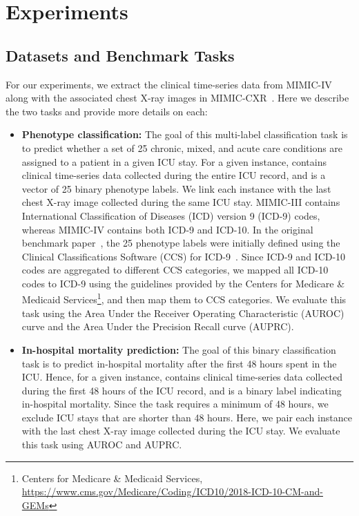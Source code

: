 \documentclass[pmlr]{jmlr}
\begin{document}
\vspace{-0.5mm}
\section{Experiments}
\label{sec:exp}
\subsection{Datasets and Benchmark Tasks} For our experiments, we extract the clinical time-series data from MIMIC-IV~\citep{mimic4} along with the associated chest X-ray images in MIMIC-CXR~\citep{mimiccxrjpg}. 
Here we describe the two tasks and provide more details on each:
\vspace{-0.5mm}
\begin{itemize}\setlength\itemsep{-0.5em}
    \item \textbf{Phenotype classification:} The goal of this multi-label classification task is to predict whether a set of 25 chronic, mixed, and acute care conditions are assigned to a patient in a given ICU stay. For a given instance,  contains clinical time-series data collected during the entire ICU record, and  is a vector of 25 binary phenotype labels. We link each instance with the last chest X-ray image collected during the same ICU stay. MIMIC-III contains International Classification of Diseases (ICD) version 9 (ICD-9) codes, whereas MIMIC-IV contains both ICD-9 and ICD-10. In the original benchmark paper~\citep{benchhmark}, the 25 phenotype labels were initially defined using the Clinical Classifications Software (CCS) for ICD-9~\citep{ccs_9}. Since ICD-9 and ICD-10 codes are aggregated to different CCS categories, we mapped all ICD-10 codes to ICD-9 using the guidelines provided by the Centers for Medicare \& Medicaid Services\footnote{Centers for Medicare \& Medicaid Services, \url{https://www.cms.gov/Medicare/Coding/ICD10/2018-ICD-10-CM-and-GEMs}}, and then map them to CCS categories. We evaluate this task using the Area Under the Receiver Operating Characteristic (AUROC) curve and the Area Under the Precision Recall curve (AUPRC).
     \item \textbf{In-hospital mortality prediction:} The goal of this binary classification task is to predict in-hospital mortality after the first 48 hours spent in the ICU. Hence, for a given instance,  contains clinical time-series data collected during the first 48 hours of the ICU record, and  is a binary label indicating in-hospital mortality. Since the task requires a minimum of 48 hours, we exclude ICU stays that are shorter than 48 hours. Here, we pair each instance with the last chest X-ray image collected during the ICU stay. We evaluate this task using AUROC and AUPRC.
\end{itemize}
\end{document}

